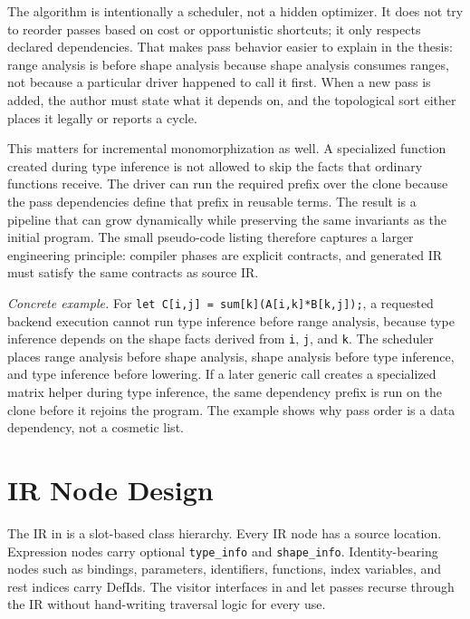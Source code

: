The algorithm is intentionally a scheduler, not a hidden optimizer. It does not
try to reorder passes based on cost or opportunistic shortcuts; it only respects
declared dependencies. That makes pass behavior easier to explain in the thesis:
range analysis is before shape analysis because shape analysis consumes ranges,
not because a particular driver happened to call it first. When a new pass is
added, the author must state what it depends on, and the topological sort either
places it legally or reports a cycle.

This matters for incremental monomorphization as well. A specialized function
created during type inference is not allowed to skip the facts that ordinary
functions receive. The driver can run the required prefix over the clone because
the pass dependencies define that prefix in reusable terms. The result is a
pipeline that can grow dynamically while preserving the same invariants as the
initial program. The small pseudo-code listing therefore captures a larger
engineering principle: compiler phases are explicit contracts, and generated IR
must satisfy the same contracts as source IR.

\textit{Concrete example.} For \texttt{let C[i,j] =
sum[k](A[i,k]*B[k,j]);}, a requested backend execution cannot run type
inference before range analysis, because type inference depends on the shape
facts derived from \texttt{i}, \texttt{j}, and \texttt{k}. The scheduler places
range analysis before shape analysis, shape analysis before type inference, and
type inference before lowering. If a later generic call creates a specialized
matrix helper during type inference, the same dependency prefix is run on the
clone before it rejoins the program. The example shows why pass order is a data
dependency, not a cosmetic list.

\section{IR Node Design}

The IR in  is a slot-based class hierarchy.
Every IR node has a source location. Expression nodes carry optional
\texttt{type\_info} and \texttt{shape\_info}. Identity-bearing nodes such as
bindings, parameters, identifiers, functions, index variables, and rest indices
carry DefIds. The visitor interfaces in  and
 let passes recurse through the IR
without hand-writing traversal logic for every use.

